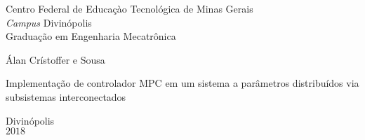 

\vspace*{1.0cm}

\begin{center}
    {\textsc  Centro Federal de Educaçào Tecnológica de Minas Gerais\\
        \textit{Campus} Divinópolis\\
        Graduação em Engenharia Mecatrônica}
\end{center}

\vspace*{3.0cm}

\begin{center}
    \large Álan Crístoffer e Sousa
\end{center}

\vspace*{2.5cm}

\begin{center}
    {\textsc Implementação de controlador MPC em um sistema a parâmetros
             distribuídos via subsistemas interconectados} %
\end{center}

\vspace*{4cm}

\columnwidth{}
\centerline{}

\null\vfill

\begin{center}
    Divinópolis\\
    \(2018\) %
\end{center}

\thispagestyle{empty}
\cleardoublepage{}


\vspace*{1.2cm}


